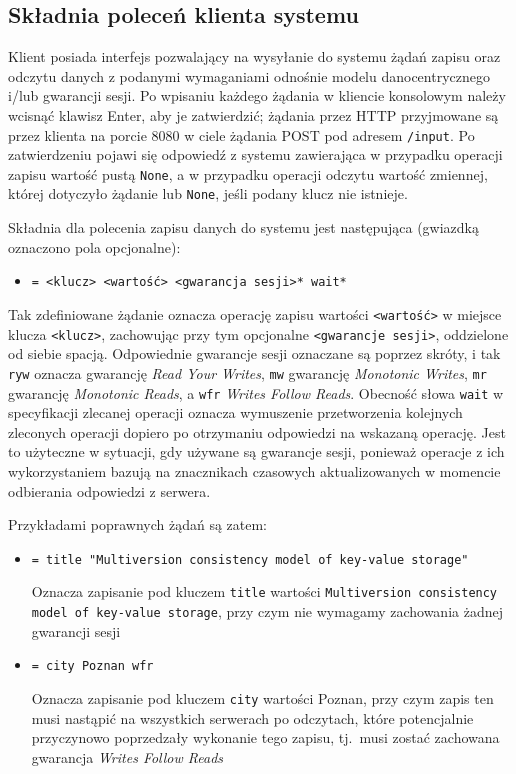 \subsection{Składnia poleceń klienta systemu} \label{subsubsection:console_interface}

Klient posiada interfejs pozwalający na wysyłanie do systemu żądań zapisu oraz odczytu danych z podanymi wymaganiami odnośnie modelu danocentrycznego i/lub gwarancji sesji. Po wpisaniu każdego żądania w kliencie konsolowym należy wcisnąć klawisz Enter, aby je zatwierdzić; żądania przez HTTP przyjmowane są przez klienta na porcie 8080 w ciele żądania POST pod adresem \texttt{/input}. Po zatwierdzeniu pojawi się odpowiedź z systemu zawierająca w przypadku operacji zapisu wartość pustą \texttt{None}, a w przypadku operacji odczytu wartość zmiennej, której dotyczyło żądanie lub \texttt{None}, jeśli podany klucz nie istnieje.

Składnia dla polecenia zapisu danych do systemu jest następująca (gwiazdką oznaczono pola opcjonalne):

\begin{itemize}[label={}]
    \item \texttt{= <klucz> <wartość> <gwarancja sesji>* wait*}
\end{itemize}

Tak zdefiniowane żądanie oznacza operację zapisu wartości \texttt{<wartość>} w miejsce klucza \texttt{<klucz>}, zachowując przy tym opcjonalne \texttt{<gwarancje sesji>}, oddzielone od siebie spacją. Odpowiednie gwarancje sesji oznaczane są poprzez skróty, i tak \texttt{ryw} oznacza gwarancję \textit{Read Your Writes}, \texttt{mw} gwarancję \textit{Monotonic Writes}, \texttt{mr} gwarancję \textit{Monotonic Reads}, a \texttt{wfr} \textit{Writes Follow Reads}. Obecność słowa \texttt{wait} w specyfikacji zlecanej operacji oznacza wymuszenie przetworzenia kolejnych zleconych operacji dopiero po otrzymaniu odpowiedzi na wskazaną operację. Jest to użyteczne w sytuacji, gdy używane są gwarancje sesji, ponieważ operacje z ich wykorzystaniem bazują na znacznikach czasowych aktualizowanych w momencie odbierania odpowiedzi z serwera.

Przykładami poprawnych żądań są zatem:

\begin{itemize}[label={}]
    \item \texttt{= title "Multiversion consistency model of key-value storage"}
    
    Oznacza zapisanie pod kluczem \texttt{title} wartości \texttt{Multiversion consistency model of key-value storage}, przy czym nie wymagamy zachowania żadnej gwarancji sesji
    
    \item \texttt{= city Poznan wfr}
    
    Oznacza zapisanie pod kluczem \texttt{city} wartości Poznan, przy czym zapis ten musi nastąpić
        na wszystkich serwerach po odczytach, które potencjalnie przyczynowo poprzedzały wykonanie
        tego zapisu, tj.\ musi zostać zachowana gwarancja \textit{Writes Follow Reads}
\end{itemize}

